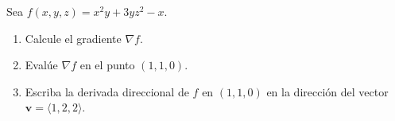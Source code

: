 Sea $f(x,y,z)=x^2y+3yz^2-x$.
\begin{enumerate}
    \item Calcule el gradiente $\nabla f$.
    \item Evalúe $\nabla f$ en el punto $(1,1,0)$.
    \item Escriba la derivada direccional de $f$ en $(1,1,0)$ en la dirección del vector $\mathbf{v}=\langle 1,2,2\rangle$.
\end{enumerate}
